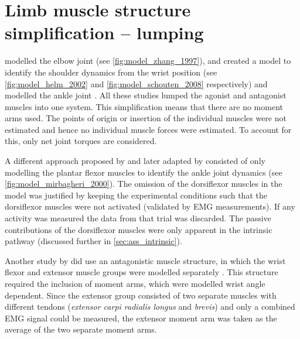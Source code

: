 \section{Limb muscle structure simplification -- lumping }
\citeauthor{zhang_simultaneous_1997} modelled the elbow joint \cite{zhang_simultaneous_1997} (see \autoref{fig:model_zhang_1997}), \citeauthor{van_der_helm_identification_2002} and \citeauthor{schouten_nmclab_2008} created a model to identify the shoulder dynamics from the wrist position \cite{van_der_helm_identification_2002, schouten_nmclab_2008} (see \autoref{fig:model_helm_2002} and \ref{fig:model_schouten_2008} respectively) and \citeauthor{mugge_rigorous_2010} modelled the ankle joint \cite{mugge_rigorous_2010}. All these studies lumped the agonist and antagonist muscles into one system. This simplification means that there are no moment arms used. The points of origin or insertion of the individual muscles were not estimated and hence no individual muscle forces were estimated. To account for this, only net joint torques are considered. 

A different approach proposed by \citeauthor{kearney_identification_1997} and later adapted by \citeauthor{mirbagheri_intrinsic_2000} consisted of only modelling the plantar flexor muscles to identify the ankle joint dynamics \cite{kearney_identification_1997, mirbagheri_intrinsic_2000} (see \autoref{fig:model_mirbagheri_2000}). The omission of the dorsiflexor muscles in the model was justified by keeping the experimental conditions such that the dorsiflexor muscles were not activated (validated by EMG measurements). If any activity was measured the data from that trial was discarded. The passive contributions of the dorsiflexor muscles were only apparent in the intrinsic pathway (discussed further in \autoref{sec:ass_intrinsic}). 

Another study by \citeauthor{de_gooijer-van_de_groep_estimation_2016} did use an antagonistic muscle structure, in which the wrist flexor and extensor muscle groups were modelled separately \cite{de_gooijer-van_de_groep_estimation_2016}. This structure required the inclusion of moment arms, which were modelled wrist angle dependent. Since the extensor group consisted of two separate muscles with different tendons (\textit{extensor carpi radialis longus} and \textit{brevis}) and only a combined EMG signal could be measured, the extensor moment arm was taken as the average of the two separate moment arms. 



